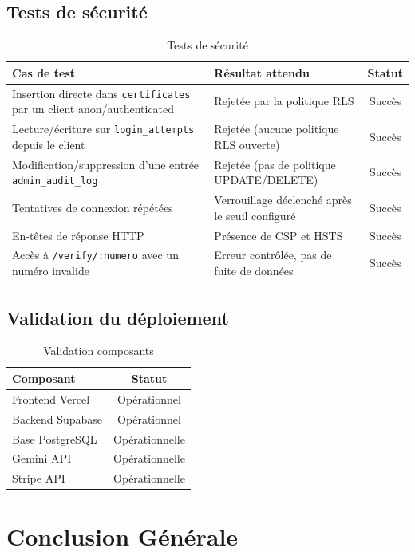 \documentclass[12pt, a4paper]{report}
\begin{document}
\section{Tests de sécurité}
\begin{table}[H]
\centering
\caption{Tests de sécurité}
\begin{tabularx}{\textwidth}{|p{5cm}|X|c|}
\hline
\textbf{Cas de test} & \textbf{Résultat attendu} & \textbf{Statut} \\
\hline
Insertion directe dans \texttt{certificates} par un client anon/authenticated & Rejetée par la politique RLS & Succès \\
\hline
Lecture/écriture sur \texttt{login\_attempts} depuis le client & Rejetée (aucune politique RLS ouverte) & Succès \\
\hline
Modification/suppression d'une entrée \texttt{admin\_audit\_log} & Rejetée (pas de politique UPDATE/DELETE) & Succès \\
\hline
Tentatives de connexion répétées & Verrouillage déclenché après le seuil configuré & Succès \\
\hline
En-têtes de réponse HTTP & Présence de CSP et HSTS & Succès \\
\hline
Accès à \texttt{/verify/:numero} avec un numéro invalide & Erreur contrôlée, pas de fuite de données & Succès \\
\hline
\end{tabularx}
\end{table}

\section{Validation du déploiement}
\begin{table}[H]
\centering
\caption{Validation composants}
\begin{tabular}{|l|c|}
\hline
Composant & Statut \\
\hline
Frontend Vercel & Opérationnel \\
\hline
Backend Supabase & Opérationnel \\
\hline
Base PostgreSQL & Opérationnelle \\
\hline
Gemini API & Opérationnelle \\
\hline
Stripe API & Opérationnelle \\
\hline
\end{tabular}
\end{table}

\chapter*{Conclusion Générale}
\end{document}
